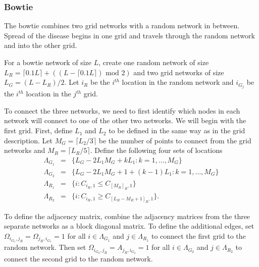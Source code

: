 \documentclass[11pt]{article}
\begin{document}
\subsubsection{Bowtie}
\label{sec-3-1-5}

The bowtie combines two grid networks with a random network in
between.  Spread of the disease begins in one grid and travels through
the random network and into the other grid.

For a bowtie network of size $L$, create one random network of size
$L_R = \lceil 0.1 L \rceil + ((L - \lceil 0.1 L \rceil) \text{ mod }
    2)$ and two grid networks of size $L_G = (L - L_R)/2$.  Let $i_{R}$ be
the $i^{th}$ location in the random network and $i_{G_j}$ be the
$i^{th}$ location in the $j^{th}$ grid.

To connect the three networks, we need to first identify which nodes
in each network will connect to one of the other two networks.  We
will begin with the first grid.  First, define $L_1$ and $L_2$ to be
defined in the same way as in the grid description.  Let $M_{G} =
    \lceil L_2/3 \rceil$ be the number of points to connect from the grid
networks and $M_{R} = \lceil L_R/5 \rceil$.  Define the following four
sets of locations
\begin{equation*}
  \begin{array}{rcl}
    \Lambda_{G_1} & = & \lbrace L_G -
                        2L_1M_G + kL_1 : k = 1,\ldots,M_G\rbrace\\
    \Lambda_{G_2} & = & \lbrace L_G -
                        2L_1M_G + 1 + (k-1)L_1 : k =
                        1,\ldots,M_G\rbrace\\
    \Lambda_{R_1} & = & \lbrace i : C_{i_R,1} \le C_{[M_R]_{R},1} \rbrace\\
    \Lambda_{R_2} & = & \lbrace i : C_{i_R,1} \ge C_{[L_R - M_R + 1]_{R},1} \rbrace.
  \end{array}
\end{equation*}

To define the adjacency matrix, combine the adjacency matrices from
the three separate networks as a block diagonal matrix.  To define the
additional edges, set $\Omega_{i_{G_1},j_R} = \Omega_{j_R,i_{G_1}} =
    1$ for all $i \in \Lambda_{G_1}$ and $j \in \Lambda_{R_1}$ to connect
the first grid to the random network.  Then set $\Omega_{i_{G_2},j_R}
    = A_{j_R,i_{G_2}} = 1$ for all $i \in \Lambda_{G_2}$ and $j \in
    \Lambda_{R_2}$ to connect the second grid to the random network.
\end{document}
